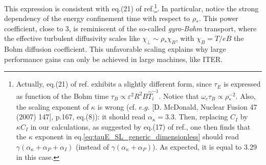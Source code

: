 This expression is consistent with eq.(21) of ref.\cite{ITERphysics_chap2}\footnote{Actually, eq.(21) of ref.\cite{ITERphysics_chap2} exhibits a slightly different form, since $\tau_E$ is expressed as function of the Bohm time $\tau_B \propto \varepsilon^2R^2B\hat T_i^{-1}$. Notice that $\omega_c\tau_B \propto \rho_*^{-2}$. Also, the scaling exponent of $\kappa$ is wrong (cf. $e.g.$ [D. McDonald, Nuclear Fusion 47 (2007) 147], p.167, eq.(8)): it should read $\alpha_\kappa = 3.3$. Then, replacing $C_I$ by $\kappa C_I$ in our calculations, as suggested by eq.(17) of ref.\cite{ITERphysics_chap2}, one then finds that the $\kappa$ exponent in eq.\ref{eq:tauE_SL_generic_dimensionless} should read $\gamma(\alpha_\kappa+\alpha_P+\alpha_I)$ (instead of $\gamma(\alpha_\kappa+\alpha_P)$). As expected, it is equal to 3.29 in this case.}. In particular, notice the strong dependency of the energy confinement time with respect to $\rho_*$. This power coefficient, close to 3, is reminiscent of the so-called \emph{gyro-Bohm} transport, where the effective turbulent diffusivity scales like $\chi_\perp \sim \rho_* \chi_{B}$, with $\chi_B = T/eB$ the Bohm diffusion coefficient. This unfavorable scaling explains why large performance gains can only be achieved in large machines, like ITER.